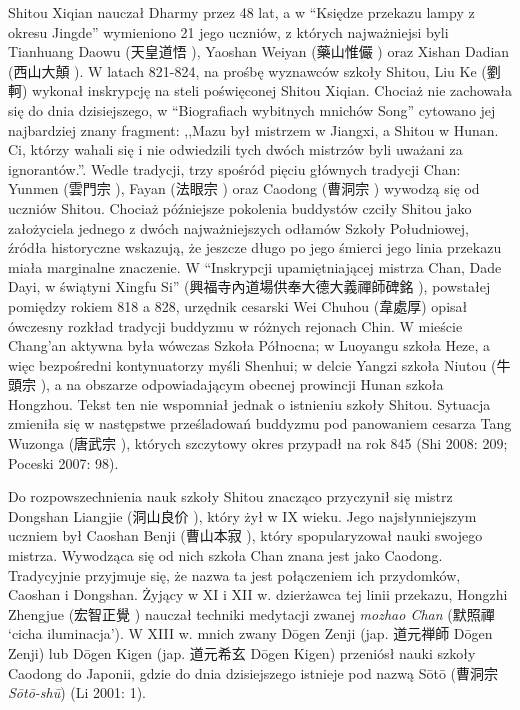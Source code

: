Shitou Xiqian nauczał Dharmy przez 48 lat, a w ``Księdze przekazu lampy z okresu Jingde'' wymieniono 21 jego uczniów, z których najważniejsi byli Tianhuang Daowu (天皇道悟 ), Yaoshan Weiyan (藥山惟儼 ) oraz Xishan Dadian (西山大顛 ).
W latach 821-824, na prośbę wyznawców szkoły Shitou, Liu Ke (劉軻) wykonał inskrypcję na steli poświęconej Shitou Xiqian.
Chociaż nie zachowała się do dnia dzisiejszego, w ``Biografiach wybitnych mnichów Song'' cytowano jej najbardziej znany fragment: ,,Mazu był mistrzem w Jiangxi, a Shitou w Hunan. Ci, którzy wahali się i nie odwiedzili tych dwóch mistrzów byli uważani za ignorantów.''.
Wedle tradycji, trzy spośród pięciu głównych tradycji Chan: Yunmen (雲門宗 ), Fayan (法眼宗 ) oraz Caodong (曹洞宗 ) wywodzą się od uczniów Shitou.
Chociaż późniejsze pokolenia buddystów czciły Shitou jako założyciela jednego z dwóch najważniejszych odłamów Szkoły Południowej, źródła historyczne wskazują, że jeszcze długo po jego śmierci jego linia przekazu miała marginalne znaczenie.
W ``Inskrypcji upamiętniającej mistrza Chan, Dade Dayi, w świątyni Xingfu Si'' (興福寺內道場供奉大德大義禪師碑銘 ), powstałej pomiędzy rokiem 818 a 828, urzędnik cesarski Wei Chuhou (韋處厚) opisał ówczesny rozkład tradycji buddyzmu w różnych rejonach Chin.
W mieście Chang'an aktywna była wówczas Szkoła Północna; w Luoyangu szkoła Heze, a więc bezpośredni kontynuatorzy myśli Shenhui; w delcie Yangzi szkoła Niutou (牛頭宗 ), a na obszarze odpowiadającym obecnej prowincji Hunan szkoła Hongzhou.
Tekst ten nie wspomniał jednak o istnieniu szkoły Shitou.
Sytuacja zmieniła się w następstwe prześladowań buddyzmu pod panowaniem cesarza Tang Wuzonga (唐武宗 ), których szczytowy okres przypadł na rok 845
(Shi 2008: 209; Poceski 2007: 98).

Do rozpowszechnienia nauk szkoły Shitou znacząco przyczynił się mistrz Dongshan Liangjie (洞山良价 ), który żył w IX wieku.
Jego najsłynniejszym uczniem był Caoshan Benji (曹山本寂 ), który spopularyzował nauki swojego mistrza.
Wywodząca się od nich szkoła Chan znana jest jako Caodong.
Tradycyjnie przyjmuje się, że nazwa ta jest połączeniem ich przydomków, Caoshan i Dongshan.
Żyjący w XI i XII w. dzierżawca tej linii przekazu, Hongzhi Zhengjue (宏智正覺 ) nauczał techniki medytacji zwanej \textit{mozhao Chan} (默照禪  `cicha iluminacja').
W XIII w. mnich zwany Dōgen Zenji (jap. {\ipaexgothic 道元禅師} Dōgen Zenji) lub Dōgen Kigen (jap. {\ipaexgothic 道元希玄} Dōgen Kigen) przeniósł nauki szkoły Caodong do Japonii, gdzie do dnia dzisiejszego istnieje pod nazwą Sōtō ({\ipaexgothic 曹洞宗} \textit{Sōtō-shū})
(Li 2001: 1).

